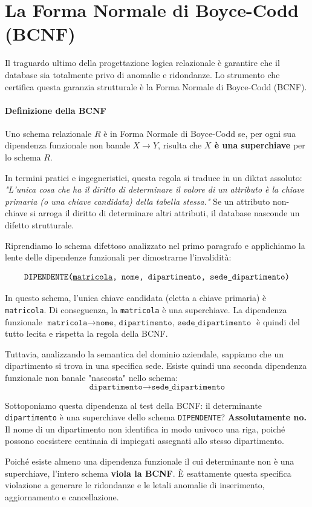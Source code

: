 \section{La Forma Normale di Boyce-Codd (BCNF)}

Il traguardo ultimo della progettazione logica relazionale è garantire che il database sia totalmente privo di anomalie e ridondanze. Lo strumento che certifica questa garanzia strutturale è la Forma Normale di Boyce-Codd (BCNF). 

\paragraph{Definizione della BCNF}
Uno schema relazionale $R$ è in Forma Normale di Boyce-Codd se, per ogni sua dipendenza funzionale non banale $X \rightarrow Y$, risulta che \textbf{$X$ è una superchiave} per lo schema $R$.

In termini pratici e ingegneristici, questa regola si traduce in un diktat assoluto: \textit{"L'unica cosa che ha il diritto di determinare il valore di un attributo è la chiave primaria (o una chiave candidata) della tabella stessa."} Se un attributo non-chiave si arroga il diritto di determinare altri attributi, il database nasconde un difetto strutturale.

\begin{example}
Riprendiamo lo schema difettoso analizzato nel primo paragrafo e applichiamo la lente delle dipendenze funzionali per dimostrarne l'invalidità:

$$ \texttt{DIPENDENTE(\underline{matricola}, nome, dipartimento, sede\_dipartimento)} $$

In questo schema, l'unica chiave candidata (eletta a chiave primaria) è \texttt{matricola}. Di conseguenza, la \texttt{matricola} è una superchiave. La dipendenza funzionale $\texttt{matricola} \rightarrow \texttt{nome, dipartimento, sede\_dipartimento}$ è quindi del tutto lecita e rispetta la regola della BCNF.

Tuttavia, analizzando la semantica del dominio aziendale, sappiamo che un dipartimento si trova in una specifica sede. Esiste quindi una seconda dipendenza funzionale non banale "nascosta" nello schema:
$$ \texttt{dipartimento} \rightarrow \texttt{sede\_dipartimento} $$

Sottoponiamo questa dipendenza al test della BCNF: il determinante \texttt{dipartimento} è una superchiave dello schema \texttt{DIPENDENTE}? \textbf{Assolutamente no.} Il nome di un dipartimento non identifica in modo univoco una riga, poiché possono coesistere centinaia di impiegati assegnati allo stesso dipartimento.

Poiché esiste almeno una dipendenza funzionale il cui determinante non è una superchiave, l'intero schema \textbf{viola la BCNF}. È esattamente questa specifica violazione a generare le ridondanze e le letali anomalie di inserimento, aggiornamento e cancellazione.
\end{example}

